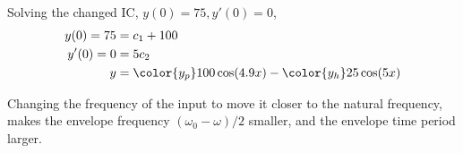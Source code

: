 \begin{enumerate}
          Solving the changed IC, $ y(0) = 75, y'(0) = 0 $,
          \begin{align}
              y(0) = 75 & = c_{1} + 100                  \\
              y'(0) = 0 & = 5c_{2}                       \\
              y         & = {\color{y_p} 100\cos(4.9x) }
              - {\color{y_h} 25\cos(5x)}
          \end{align}

          \begin{figure}[H]
              \centering
          \end{figure}
          \par
          Changing the frequency of the input to move it closer to the natural frequency,
          makes the envelope frequency $ (\omega_{0} - \omega)/2 $ smaller, and the envelope
          time period larger.


\end{enumerate}
